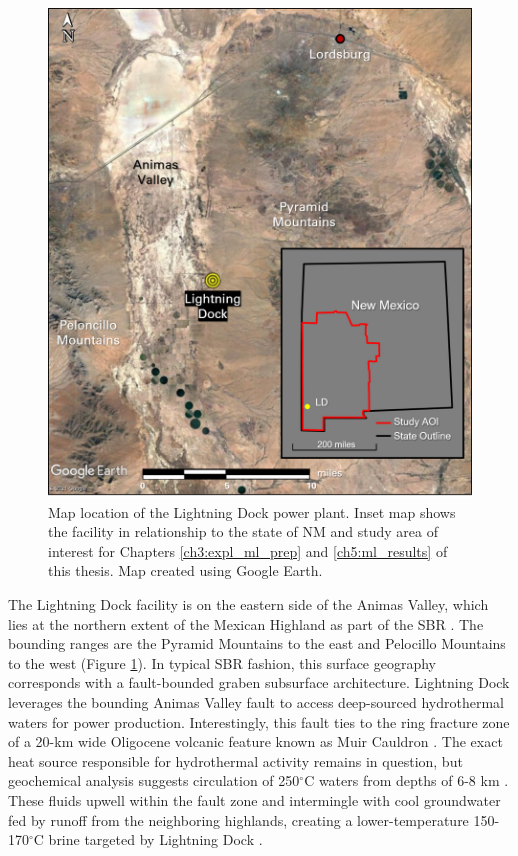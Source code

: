\begin{figure}%
\centering
\includegraphics[width=.85\textwidth]{templates/images/Figure-Lightning_Dock_Location_composite.png}
\caption[Lightning Dock location map]{Map location of the Lightning Dock power plant. Inset map shows the facility in relationship to the state of NM and study area of interest for Chapters \ref{ch3:expl_ml_prep} and \ref{ch5:ml_results} of this thesis. Map created using Google Earth.}
\label{fig:lightning_dock_map}
\end{figure}

The Lightning Dock facility is on the eastern side of the Animas Valley, which lies at the northern extent of the Mexican Highland as part of the SBR \citep{cunniff_final_2005}. The bounding ranges are the Pyramid Mountains to the east and Pelocillo Mountains to the west (Figure \ref{fig:lightning_dock_map}). In typical SBR fashion, this surface geography corresponds with a fault-bounded graben subsurface architecture. Lightning Dock leverages the bounding Animas Valley fault to access deep-sourced hydrothermal waters for power production. Interestingly, this fault ties to the ring fracture zone of a 20-km wide Oligocene volcanic feature known as Muir Cauldron \citep{elston_geology_1983}. The exact heat source responsible for hydrothermal activity remains in question, but geochemical analysis suggests circulation of 250$^\circ$C waters from depths of 6-8 km \citep{schochet_development_2001}. These fluids upwell within the fault zone and intermingle with cool groundwater fed by runoff from the neighboring highlands, creating a lower-temperature 150-170$^\circ$C brine targeted by Lightning Dock \citep{crowell_history_2014}.

